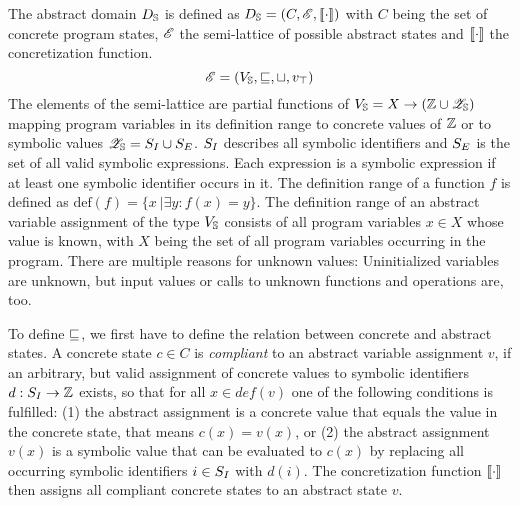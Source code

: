 The abstract domain $D_{\mathbb{S}}$ is defined as
$D_{\mathbb{S}} = (C, \mathscr{E}, [\![ \cdot ]\!] )$
with $C$ being the set of concrete program states, $\mathscr{E}$ the semi-lattice of possible abstract states and $[\![ \cdot ]\!]$ the concretization function.
\[\mathscr{E} = (V_{\mathbb{S}},
                  \sqsubseteq, 
                  \sqcup, 
                  v_\top
                )        
\]
The elements of the semi-lattice are partial functions of $V_{\mathbb{S}} = X \rightarrow (\mathbb{Z} \cup \mathscr{Z}_{\mathbb{S}})$ mapping program variables in its definition range to concrete values of $\mathbb{Z}$
or to symbolic values $\mathscr{Z}_{\mathbb{S}} = S_I \cup S_E$.
$S_I$ describes all symbolic identifiers and
$S_E$ is the set of all valid symbolic expressions. Each expression is a symbolic expression if at least one symbolic identifier occurs in it.
The definition range of a function $f$ is defined as $\text{def}(f) = \{x\ | \exists y: f(x) = y\}$. The definition range of an abstract variable assignment of the type $V_{\mathbb{S}}$ consists of all program variables $x \in X$ whose value is known, with $X$ being the set of all program variables occurring in the program. There are multiple reasons for unknown values: Uninitialized variables are unknown, but input values or calls to unknown functions and operations are, too.

To define $\sqsubseteq$, we first have to define the relation between concrete and abstract states.
A concrete state $c \in C$ is \emph{compliant} to an abstract variable assignment $v$, if an arbitrary, but valid assignment of concrete values to symbolic identifiers $d: S_I \rightarrow \mathbb{Z}$ exists, so that for all $x \in def(v)$ one of the following conditions is fulfilled:
(1) the abstract assignment is a concrete value that equals the value in the concrete state, that means $c(x) = v(x)$, or
(2) the abstract assignment $v(x)$ is a symbolic value that can be evaluated to $c(x)$ by replacing all occurring symbolic identifiers $i \in S_I$ with $d(i)$.
The concretization function $[\![ \cdot ]\!]$ then assigns all compliant concrete states to an abstract state $v$.

